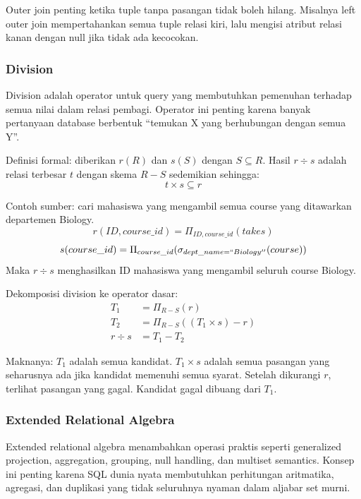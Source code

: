 Outer join penting ketika tuple tanpa pasangan tidak boleh hilang. Misalnya left outer join mempertahankan semua tuple relasi kiri, lalu mengisi atribut relasi kanan dengan null jika tidak ada kecocokan.

\subsubsection{Division}

\begin{jawab}
Division adalah operator untuk query yang membutuhkan pemenuhan terhadap semua nilai dalam relasi pembagi. Operator ini penting karena banyak pertanyaan database berbentuk ``temukan X yang berhubungan dengan semua Y''.
\end{jawab}

Definisi formal: diberikan \(r(R)\) dan \(s(S)\) dengan \(S \subseteq R\). Hasil \(r \div s\) adalah relasi terbesar \(t\) dengan skema \(R-S\) sedemikian sehingga:
\begin{equation}
    t \times s \subseteq r
    \label{eq:division-definition}
\end{equation}

Contoh sumber: cari mahasiswa yang mengambil semua course yang ditawarkan departemen Biology.
\[
    r(ID,course\_id)=\Pi_{ID,course\_id}(takes)
\]
\[
    s(course\_id)=\Pi_{course\_id}(\sigma_{dept\_name=``Biology''}(course))
\]
Maka \(r \div s\) menghasilkan ID mahasiswa yang mengambil seluruh course Biology.

Dekomposisi division ke operator dasar:
\begin{align}
    T_1 &= \Pi_{R-S}(r) \\
    T_2 &= \Pi_{R-S}((T_1 \times s)-r) \\
    r \div s &= T_1 - T_2
\end{align}

Maknanya: \(T_1\) adalah semua kandidat. \(T_1 \times s\) adalah semua pasangan yang seharusnya ada jika kandidat memenuhi semua syarat. Setelah dikurangi \(r\), terlihat pasangan yang gagal. Kandidat gagal dibuang dari \(T_1\).

\subsubsection{Extended Relational Algebra}

\begin{jawab}
Extended relational algebra menambahkan operasi praktis seperti generalized projection, aggregation, grouping, null handling, dan multiset semantics. Konsep ini penting karena SQL dunia nyata membutuhkan perhitungan aritmatika, agregasi, dan duplikasi yang tidak seluruhnya nyaman dalam aljabar set murni.
\end{jawab}

